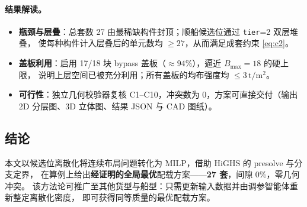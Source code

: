 \documentclass[11pt]{article}
\newcommand{\unit}[1]{\,\mathrm{#1}}
\begin{document}
\paragraph{结果解读。}
\begin{itemize}[leftmargin=1.8em,itemsep=2pt]
  \item \textbf{瓶颈与层叠}：总套数 27 由最稀缺构件封顶；顺船候选位通过 \texttt{tier}=2 双层堆叠，
  使每种构件计入层叠后的单元数均 $\ge 27$，从而满足成套约束 \eqref{eq:c2}。
  \item \textbf{盖板利用}：启用 17/18 块 bypass 盖板（$\approx 94\%$），逼近 $B_{\max}=18$ 的硬上限，
  说明上层空间已被充分利用；所有盖板的均布强度均 $\le 3\unit{t/m^2}$。
  \item \textbf{可行性}：独立几何校验器复核 C1--C10，冲突数为 0，方案可直接交付（输出 2D 分层图、3D 立体图、结果 JSON 与 CAD 图纸）。
\end{itemize}

\subsection{结论}
本文以候选位离散化将连续布局问题转化为 MILP，借助 HiGHS 的 presolve 与分支定界，
在算例上给出\textbf{经证明的全局最优}配载方案——\textbf{27 套}，间隙 $0\%$，零几何冲突。
该方法论可推广至其他货型与船型：只需更新输入数据并由调参智能体重新整定离散化密度，
即可获得同等质量的最优配载方案。
\end{document}
